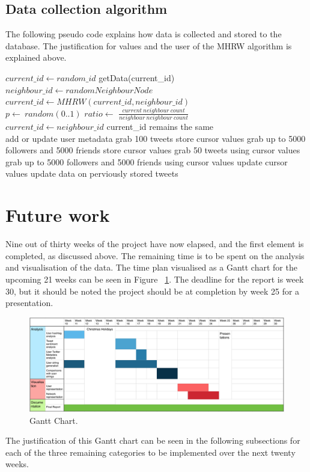 \documentclass[a4paper]{article}
\begin{document}
\subsection{Data collection algorithm} 
\label{subsec:pseudo}
The following pseudo code explains how data is collected and stored to the database. The justification for values and the user of the MHRW algorithm is explained above.\\
\begin{algorithmic}
	\State $current\_id \gets random\_id$
		\State getData(current\_id)
		\State $neighbour\_id \gets randomNeighbourNode$
		\State $current\_id \gets MHRW(current\_id, neighbour\_id)$
	\EndWhile
\EndFunction\\

	\State $p\gets ~random(0..1)$
	\State $ratio\gets $ $\frac{current\ neighbour\ count}{neighbour\ neighbour\ count}$\\

		\State $current\_id \gets neighbour\_id$
	\Else{}
		\State current\_id remains the same
	\EndIf
\EndFunction\\

	\State add or update user metadata
		\State grab 100 tweets
		\State store cursor values
		\State grab up to 5000 followers and 5000 friends
		\State store cursor values
		\State grab 50 tweets using cursor values
		\State grab up to 5000 followers and 5000 friends using cursor values
		\State update cursor values
		\State update data on perviously stored tweets
	\EndIf
\EndFunction
\end{algorithmic}

\section{Future work}
\label{sec:futurework}
Nine out of thirty weeks of the project have now elapsed, and the first element is completed, as discussed above. The remaining time is to be spent on the analysis and visualisation of the data. The time plan visualised as a Gantt chart for the upcoming 21 weeks can be seen in Figure ~\ref{fig:gantt}. The deadline for the report is week 30, but it should be noted the project should be at completion by week 25 for a presentation.
\begin{figure}
	\centering
	     \includegraphics[scale=0.5]{ganttchart.png}
	  \caption{Gantt Chart.}
	  \label{fig:gantt}
\end{figure}
The justification of this Gantt chart can be seen in the following subsections for each of the three remaining categories to be implemented over the next twenty weeks.
\end{document}
